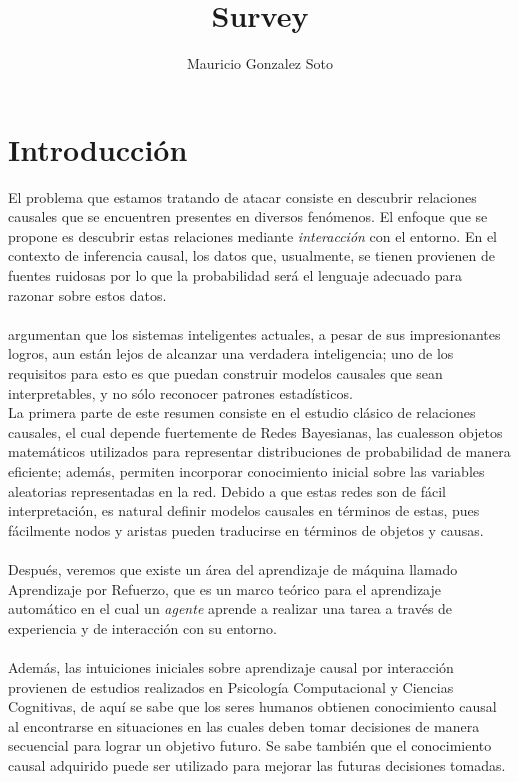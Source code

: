 \documentclass[11pt]{article}
\title{Survey}
\author{Mauricio Gonzalez Soto}
\theoremstyle{plain}
\begin{document}
\nocite{*}
\maketitle
\tableofcontents
\newpage
\section{Introducción}
El problema que estamos tratando de atacar consiste en descubrir relaciones causales que se encuentren presentes en diversos fenómenos. El enfoque que se propone es descubrir estas relaciones mediante \textit{interacción} con el entorno. En el contexto de inferencia causal, los datos que, usualmente, se tienen provienen de fuentes ruidosas por lo que la probabilidad será el lenguaje adecuado para razonar sobre estos datos.\\
\\
\cite{lake2017building} argumentan que los sistemas inteligentes actuales, a pesar de sus impresionantes logros, aun están lejos de alcanzar una verdadera inteligencia; uno de los requisitos para esto es que puedan construir modelos causales que sean interpretables, y no sólo reconocer patrones estadísticos. 
\\
La primera parte de este resumen consiste en el estudio clásico de relaciones causales, el cual depende fuertemente de Redes Bayesianas, las cualesson objetos matemáticos utilizados para representar distribuciones de probabilidad de manera eficiente; además, permiten incorporar conocimiento inicial sobre las variables aleatorias representadas en la red. Debido a que estas redes son de fácil interpretación, es natural definir modelos causales en términos de estas, pues fácilmente nodos y aristas pueden traducirse en términos de objetos y causas.\\
\\
Después, veremos que existe un área del aprendizaje de máquina llamado Aprendizaje por Refuerzo, que es un marco teórico para el aprendizaje automático en el cual un \textit{agente} aprende a realizar una tarea a través de experiencia y de interacción con su entorno.\\
\\
Además, las intuiciones iniciales sobre aprendizaje causal por interacción provienen de estudios realizados en Psicología Computacional y Ciencias Cognitivas, de aquí se sabe que los seres humanos obtienen conocimiento causal al encontrarse en situaciones en las cuales deben tomar decisiones de manera secuencial para lograr un objetivo futuro. Se sabe también que el conocimiento causal adquirido puede ser utilizado para mejorar las futuras decisiones tomadas.\\
\end{document}
